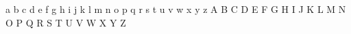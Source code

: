 a
b
c
d
e
f
g
h
i
j
k
l
m
n
o
p 
q
r
s
t
u
v
w
x
y
z
A
B
C
D
E
F
G
H
I
J
K
L
M
N
O
P
Q
R
S
T
U
V
W
X
Y
Z
